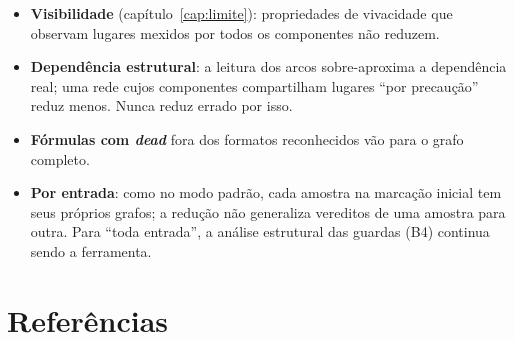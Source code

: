 \documentclass[11pt,a4paper]{report}
\theoremstyle{definition}
\begin{document}
\begin{itemize}[leftmargin=1.4em]
  \item \textbf{Visibilidade} (capítulo~\ref{cap:limite}): propriedades de
        vivacidade que observam lugares mexidos por todos os componentes não
        reduzem.
  \item \textbf{Dependência estrutural}: a leitura dos arcos sobre-aproxima a
        dependência real; uma rede cujos componentes compartilham lugares
        ``por precaução'' reduz menos. Nunca reduz errado por isso.
  \item \textbf{Fórmulas com \emph{dead}} fora dos formatos reconhecidos vão
        para o grafo completo.
  \item \textbf{Por entrada}: como no modo padrão, cada amostra na marcação
        inicial tem seus próprios grafos; a redução não generaliza vereditos
        de uma amostra para outra. Para ``toda entrada'', a análise estrutural
        das guardas (B4) continua sendo a ferramenta.
\end{itemize}

\chapter*{Referências}
\end{document}
